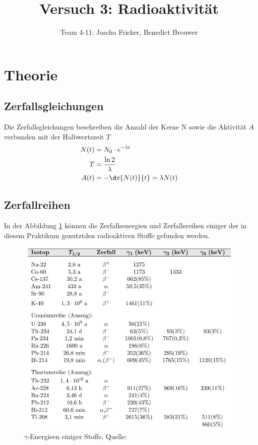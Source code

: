 \documentclass[11pt, a4paper]{article}
\title{Versuch 3: Radioaktivität}
\author{Team 4-11: Jascha Fricker, Benedict Brouwer}
\begin{document}
    \maketitle

    \tableofcontents

    \newpage

    \section{Theorie}
    \subsection{Zerfallsgleichungen}
    Die Zerfallsgleichungen beschreiben die Anzahl der Kerne N sowie die Aktivität $A$ verbunden mit der Halbwertszeit $T$
    \begin{align}
        N(t) &= N_0 \cdot e^{- \lambda t} \label{eq:zerfälleNachZeit} \\
        T &= \frac{\ln 2}{\lambda} \label{eq:Halbwertszeit}  \\ 
        A(t) &= - \dv{N(t)}{t} = \lambda N(t) \label{eq:Aktivität-halb}
    \end{align}
    
    \subsection{Zerfallreihen}
    In der Abbildung \ref{fig:zerf} können die Zerfallsenergien und Zerfallsreihen einiger der in diesem Praktikum genutztden radioaktiven Stoffe gefunden werden.

    \begin{figure}[!h]
        \centering
        \includegraphics[width=\textwidth]{Screenshot 2023-03-14 5.37.47 PM.png}

        \caption{$\gamma$-Energieen einiger Stoffe, Quelle: \cite{RAD}}
        \label{fig:zerf}
    \end{figure}
    
\end{document}
